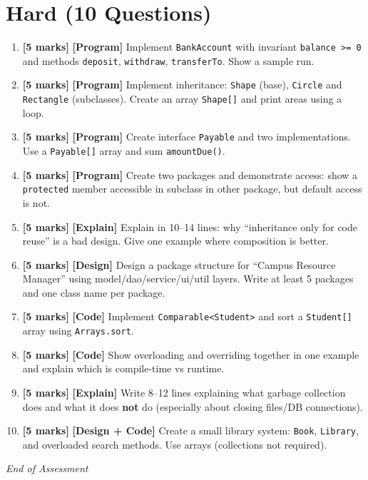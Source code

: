 \documentclass[11pt,a4paper]{article}
\newcommand{\HMarks}{\textbf{[5 marks]} }
\begin{document}
\section*{Hard (10 Questions)}
\begin{enumerate}[label=\textbf{H\arabic*.}, leftmargin=*]
  \item \HMarks \textbf{[Program]} Implement \texttt{BankAccount} with invariant \texttt{balance >= 0} and methods
    \texttt{deposit}, \texttt{withdraw}, \texttt{transferTo}. Show a sample run.

  \item \HMarks \textbf{[Program]} Implement inheritance: \texttt{Shape} (base), \texttt{Circle} and \texttt{Rectangle} (subclasses).
    Create an array \texttt{Shape[]} and print areas using a loop.

  \item \HMarks \textbf{[Program]} Create interface \texttt{Payable} and two implementations. Use a \texttt{Payable[]} array and sum \texttt{amountDue()}.

  \item \HMarks \textbf{[Program]} Create two packages and demonstrate access:
    show a \texttt{protected} member accessible in subclass in other package, but default access is not.

  \item \HMarks \textbf{[Explain]} Explain in 10--14 lines: why ``inheritance only for code reuse'' is a bad design.
    Give one example where composition is better.

  \item \HMarks \textbf{[Design]} Design a package structure for ``Campus Resource Manager'' using model/dao/service/ui/util layers.
    Write at least 5 packages and one class name per package.

  \item \HMarks \textbf{[Code]} Implement \texttt{Comparable<Student>} and sort a \texttt{Student[]} array using \texttt{Arrays.sort}.

  \item \HMarks \textbf{[Code]} Show overloading and overriding together in one example and explain which is compile-time vs runtime.

  \item \HMarks \textbf{[Explain]} Write 8--12 lines explaining what garbage collection does and what it does \textbf{not} do
    (especially about closing files/DB connections).

  \item \HMarks \textbf{[Design + Code]} Create a small library system:
    \texttt{Book}, \texttt{Library}, and overloaded search methods. Use arrays (collections not required).
\end{enumerate}

\vfill
\noindent\textit{End of Assessment}
\end{document}
